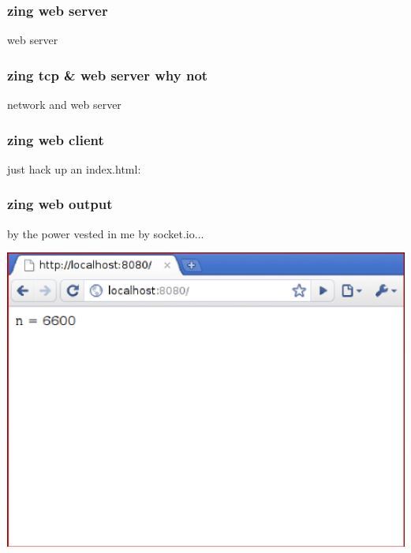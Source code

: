 \documentclass{beamer}
\begin{document}
\begin{frame}
    \frametitle{zing web server}
    
    \huge
    web server
    \newline
    
    \normalsize
    \fbox{}
\end{frame}

\begin{frame}
    \frametitle{zing tcp \& web server why not}
    
    \huge
    network and web server
    \newline
    
    \normalsize
    \fbox{}
\end{frame}

\begin{frame}
    \frametitle{zing web client}
    \huge
    just hack up an index.html:
    \newline
    
    \scriptsize
    \fbox{}
\end{frame}

\begin{frame}
    \frametitle{zing web output}
    \large
    by the power vested in me by socket.io...
    \newline
    
    \includegraphics[scale=0.6]{images/browser.png}
\end{frame}
\end{document}
